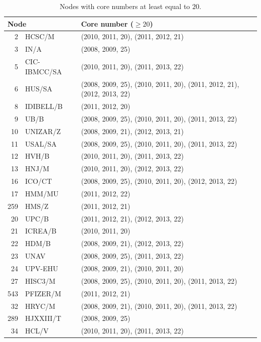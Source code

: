 \documentclass[a4paper,twoside,10pt]{article}
\begin{document}
\begin{center}
\begin{longtable}{rll}
\caption{Nodes with core numbers at least equal to $20.$}
\label{stemcellcore20}\\
 \multicolumn{2}{l}{\textbf{Node}} & \textbf{Core number} ($\geq 20$) \\
 \endhead
  2 & HCSC/M      & (2010, 2011, 20), (2011, 2012, 21) \\
	3 & IN/A        & (2008, 2009, 25) \\
  5 & CIC-IBMCC/SA& (2010, 2011, 20), (2011, 2013, 22) \\
  6 & HUS/SA      & (2008, 2009, 25), (2010, 2011, 20), (2011, 2012, 21), (2012, 2013, 22)\\
  8 & IDIBELL/B   & (2011, 2012, 20) \\
  9 & UB/B        & (2008, 2009, 25), (2010, 2011, 20), (2011, 2013, 22) \\
 10 & UNIZAR/Z    & (2008, 2009, 21), (2012, 2013, 21) \\
 11 & USAL/SA     & (2008, 2009, 25), (2010, 2011, 20), (2011, 2013, 22) \\
 12 & HVH/B       & (2010, 2011, 20), (2011, 2013, 22) \\
 13 & HNJ/M       & (2010, 2011, 20), (2012, 2013, 22) \\
 16 & ICO/CT      & (2008, 2009, 25), (2010, 2011, 20), (2012, 2013, 22) \\
 17 & HMM/MU      & (2011, 2012, 22) \\
259 & HMS/Z       & (2011, 2012, 21) \\
 20 & UPC/B       & (2011, 2012, 21), (2012, 2013, 22) \\
 21 & ICREA/B     & (2010, 2011, 20) \\
 22 & HDM/B       & (2008, 2009, 21), (2012, 2013, 22) \\
 23 & UNAV        & (2008, 2009, 25), (2011, 2013, 22) \\
 24 & UPV-EHU     & (2008, 2009, 21), (2010, 2011, 20) \\
 27 & HISC3/M     & (2008, 2009, 25), (2010, 2011, 20), (2011, 2013, 22) \\
543 & PFIZER/M    & (2011, 2012, 21) \\
 32 & HRYC/M      & (2008, 2009, 21), (2010, 2011, 20), (2011, 2013, 22) \\
289 & HJXXIII/T   & (2008, 2009, 25) \\
 34 & HCL/V       & (2010, 2011, 20), (2011, 2013, 22) \\

\end{longtable}
\end{center}
\end{document}
